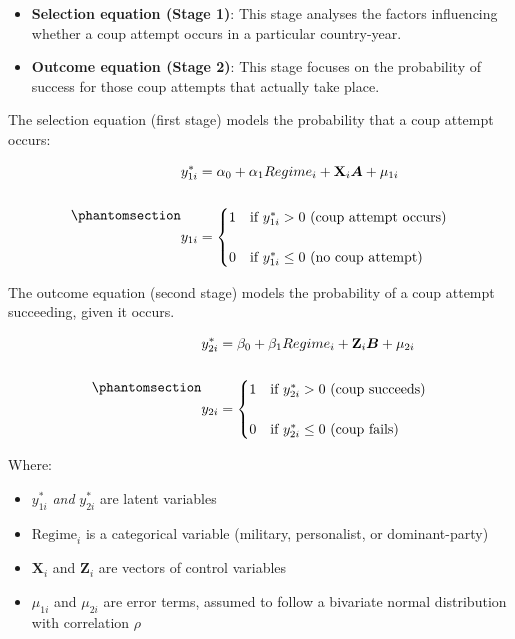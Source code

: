\documentclass[
  12pt,
]{report}
\begin{document}
\begin{itemize}
\item
  \textbf{Selection equation (Stage 1)}: This stage analyses the factors
  influencing whether a coup attempt occurs in a particular
  country-year.
\item
  \textbf{Outcome equation (Stage 2)}: This stage focuses on the
  probability of success for those coup attempts that actually take
  place.
\end{itemize}

The selection equation (first stage) models the probability that a coup
attempt occurs:

\begin{equation}\phantomsection\label{eq-eq4}{
\begin{aligned}
y_{1i}^*&=\alpha_0 + \alpha_1 Regime_i + \mathbf{X}_i \boldsymbol{A} + \mu_{1i}
\\
\\
y_{1i} &= 
\begin{cases} 
1 &\text{if $y_{1i}^*>0$ (coup attempt occurs)} \\
\\
0 &\text{if $y_{1i}^*\le0$ (no coup attempt)}
\end{cases}
\end{aligned}
}\end{equation}

The outcome equation (second stage) models the probability of a coup
attempt succeeding, given it occurs.

\begin{equation}\phantomsection\label{eq-eq5}{
\begin{aligned}
y_{2i}^*&=\beta_0 + \beta_1 Regime_i + \mathbf{Z}_i \boldsymbol{B} + \mu_{2i}
\\
\\
y_{2i} &= 
\begin{cases} 
1 &\text{if $y_{2i}^*>0$ (coup succeeds)} \\
\\
0 &\text{if $y_{2i}^*\le0$ (coup fails)}
\end{cases}
\end{aligned}
}\end{equation}

Where:

\begin{itemize}
\item
  \(y_{1i}^*\) \emph{and} \(y_{2i}^*\) are latent variables
\item
  \(\text{Regime}_i\) is a categorical variable (military, personalist,
  or dominant-party)
\item
  \(\mathbf{X}_i\) and \(\mathbf{Z}_i\) are vectors of control variables
\item
  \(\mu_{1i}\) and \(\mu_{2i}\) are error terms, assumed to follow a
  bivariate normal distribution with correlation \(\rho\)
\end{itemize}
\end{document}
